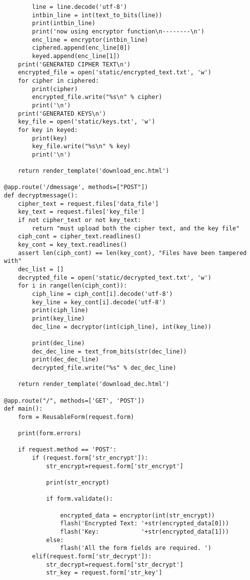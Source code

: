 \documentclass[a4paper]{article}
\begin{document}
\begin{verbatim}
        line = line.decode('utf-8')
        intbin_line = int(text_to_bits(line))
        print(intbin_line)
        print('now using encryptor function\n--------\n')
        enc_line = encryptor(intbin_line)
        ciphered.append(enc_line[0])
        keyed.append(enc_line[1])
    print('GENERATED CIPHER TEXT\n')
    encrypted_file = open('static/encrypted_text.txt', 'w')
    for cipher in ciphered:
        print(cipher)
        encrypted_file.write("%s\n" % cipher)
        print('\n')
    print('GENERATED KEYS\n')
    key_file = open('static/keys.txt', 'w')
    for key in keyed:
        print(key)
        key_file.write("%s\n" % key)
        print('\n')

    return render_template('download_enc.html')

@app.route('/dmessage', methods=["POST"])
def decryptmessage():
    cipher_text = request.files['data_file']
    key_text = request.files['key_file']
    if not cipher_text or not key_text:
        return "must upload both the cipher text, and the key file"
    ciph_cont = cipher_text.readlines()
    key_cont = key_text.readlines()
    assert len(ciph_cont) == len(key_cont), "Files have been tampered with"
    dec_list = []
    decrypted_file = open('static/decrypted_text.txt', 'w')
    for i in range(len(ciph_cont)):
        ciph_line = ciph_cont[i].decode('utf-8')
        key_line = key_cont[i].decode('utf-8')
        print(ciph_line)
        print(key_line)
        dec_line = decryptor(int(ciph_line), int(key_line))
        
        print(dec_line)
        dec_dec_line = text_from_bits(str(dec_line))
        print(dec_dec_line)
        decrypted_file.write("%s" % dec_dec_line)

    return render_template('download_dec.html')
           
@app.route("/", methods=['GET', 'POST'])
def main():
    form = ReusableForm(request.form)
 
    print(form.errors)
 
    if request.method == 'POST':
        if (request.form['str_encrypt']):
            str_encrypt=request.form['str_encrypt']
   
            print(str_encrypt)
     
            if form.validate():

                encrypted_data = encryptor(int(str_encrypt))
                flash('Encrypted Text: '+str(encrypted_data[0]))
                flash('Key:            '+str(encrypted_data[1]))
            else:
                flash('All the form fields are required. ')
        elif(request.form['str_decrypt']):
            str_decrypt=request.form['str_decrypt']
            str_key = request.form['str_key']
   

\end{verbatim}
\end{document}
